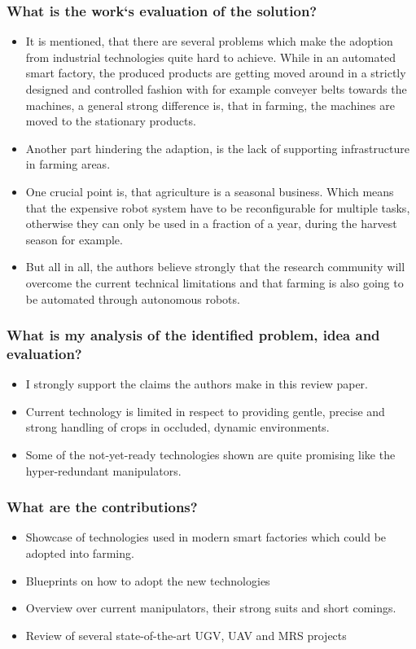     \subsubsection*{What is the work`s evaluation of the solution?}
    \begin{itemize}
        \item It is mentioned, that there are several problems which make the adoption from industrial technologies quite hard to achieve. While in an automated smart factory, the produced products are getting moved around in a strictly designed and controlled fashion with for example conveyer belts towards the machines, a general strong difference is, that in farming, the machines are moved to the stationary products.
        \item Another part hindering the adaption, is the lack of supporting infrastructure in farming areas. 
        \item One crucial point is, that agriculture is a seasonal business. Which means that the expensive robot system have to be reconfigurable for multiple tasks, otherwise they can only be used in a fraction of a year, during the harvest season for example.
        \item But all in all, the authors believe strongly that the research community will overcome the current technical limitations and that farming is also going to be automated through autonomous robots.
    \end{itemize}
    \subsubsection*{What is my analysis of the identified problem, idea and evaluation?}
    \begin{itemize}
        \item I strongly support the claims the authors make in this review paper. 
        \item Current technology is limited in respect to providing gentle, precise and strong handling of crops in occluded, dynamic environments.
        \item Some of the not-yet-ready technologies shown are quite promising like the hyper-redundant manipulators.
    \end{itemize}
    \subsubsection*{What are the contributions?}
    \begin{itemize}
        \item Showcase of technologies used in modern smart factories which could be adopted into farming.
        \item Blueprints on how to adopt the new technologies
        \item Overview over current manipulators, their strong suits and short comings.
        \item Review of several state-of-the-art UGV, UAV and MRS projects
    \end{itemize}
